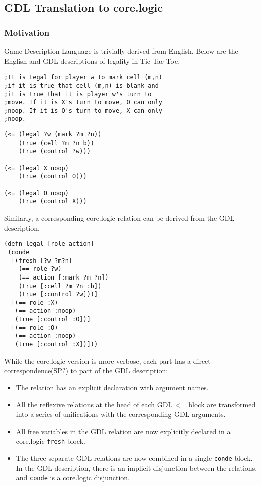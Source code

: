 \documentclass[letterpaper]{article}
\begin{document}
\subsection{GDL Translation to core.logic}
\subsubsection{Motivation}
Game Description Language is trivially derived from English. Below are the English and GDL descriptions of legality in Tic-Tac-Toe.
\begin{lstlisting}[frame=single, caption=The Legal relation for Tic-Tac-Toe expressed in English]
;It is Legal for player w to mark cell (m,n)
;if it is true that cell (m,n) is blank and
;it is true that it is player w's turn to
;move. If it is X's turn to move, O can only
;noop. If it is O's turn to move, X can only
;noop. 
\end{lstlisting}
\begin{lstlisting}[frame=single, caption=The Legal relation for Tic-Tac-Toe expressed in GDL]
(<= (legal ?w (mark ?m ?n))
    (true (cell ?m ?n b))
    (true (control ?w)))

(<= (legal X noop)
    (true (control O)))

(<= (legal O noop)
    (true (control X)))
\end{lstlisting}

Similarly, a corresponding core.logic relation can be derived from the GDL description.

\begin{lstlisting}[frame=single, caption=The Legal relation translated into core.logic]
(defn legal [role action]
 (conde
  [(fresh [?w ?m?n]
    (== role ?w)
    (== action [:mark ?m ?n])
    (true [:cell ?m ?n :b])
    (true [:control ?w]))]
  [(== role :X)
   (== action :noop)
   (true [:control :O])]
  [(== role :O)
   (== action :noop)
   (true [:control :X])]))
\end{lstlisting}

While the core.logic version is more verbose, each part has a direct correspondence(SP?) to part of the GDL description:
\begin{itemize}
\item The relation has an explicit declaration with argument names.
\item All the reflexive relations at the head of each GDL \textless= block are transformed into a series of unifications with the corresponding GDL arguments. 
\item All free variables in the GDL relation are now explicitly declared in a core.logic \texttt{fresh} block.
\item The three separate GDL relations are now combined in a single \texttt{conde} block. In the GDL description, there is an implicit disjunction between the relations, and \texttt{conde} is a core.logic disjunction.
\end{itemize}
\end{document}

